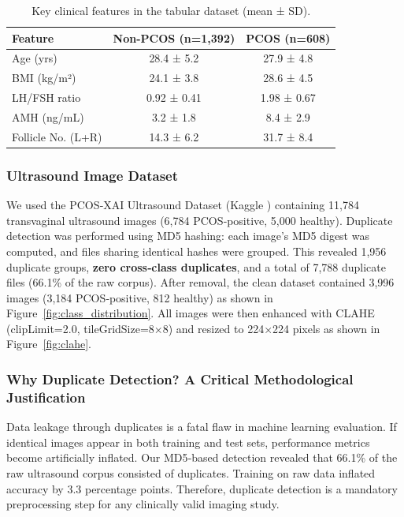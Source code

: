 \documentclass[conference]{IEEEtran}
\begin{document}
\begin{table}[htbp]
\caption{Key clinical features in the tabular dataset (mean ± SD).}
\centering
\begin{tabular}{lcc}
\hline
\textbf{Feature} & \textbf{Non-PCOS (n=1,392)} & \textbf{PCOS (n=608)} \\
\hline
Age (yrs) & 28.4 ± 5.2 & 27.9 ± 4.8 \\
BMI (kg/m²) & 24.1 ± 3.8 & 28.6 ± 4.5 \\
LH/FSH ratio & 0.92 ± 0.41 & 1.98 ± 0.67 \\
AMH (ng/mL) & 3.2 ± 1.8 & 8.4 ± 2.9 \\
Follicle No. (L+R) & 14.3 ± 6.2 & 31.7 ± 8.4 \\
\hline
\end{tabular}
\end{table}

\subsubsection{Ultrasound Image Dataset}
We used the PCOS‑XAI Ultrasound Dataset (Kaggle \cite{PCOSultrasoundKaggle}) containing 11,784 transvaginal ultrasound images (6,784 PCOS‑positive, 5,000 healthy). Duplicate detection was performed using MD5 hashing: each image’s MD5 digest was computed, and files sharing identical hashes were grouped. This revealed 1,956 duplicate groups, \textbf{zero cross‑class duplicates}, and a total of 7,788 duplicate files (66.1\% of the raw corpus). After removal, the clean dataset contained 3,996 images (3,184 PCOS‑positive, 812 healthy) as shown in Figure~\ref{fig:class_distribution}. All images were then enhanced with CLAHE (clipLimit=2.0, tileGridSize=8×8) and resized to 224×224 pixels as shown in Figure~\ref{fig:clahe}.\\

\subsubsection{Why Duplicate Detection? A Critical Methodological Justification}
Data leakage through duplicates is a fatal flaw in machine learning evaluation. If identical images appear in both training and test sets, performance metrics become artificially inflated. Our MD5‑based detection revealed that 66.1\% of the raw ultrasound corpus consisted of duplicates. Training on raw data inflated accuracy by 3.3 percentage points. Therefore, duplicate detection is a mandatory preprocessing step for any clinically valid imaging study.
\end{document}
